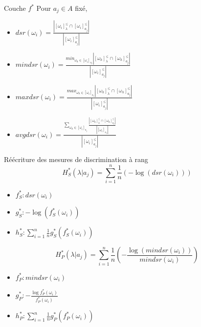 \documentclass[usenames,dvipsnames]{beamer}
\newcommand{\myfrac}[2]{\frac{\displaystyle {#1}}{\displaystyle {#2}}}
\begin{document}
\begin{frame}{Couche $f^*$}
    Pour $a_j \in A$ fixé,
    \begin{itemize}
        \item $dsr(\omega_i) = \myfrac{| [\omega_i]^{\leq}_{\lambda} \cap [\omega_i]^{\leq}_{a_j}|}{| [\omega_i]^{\leq}_{a_j} |}$
        \item $mindsr(\omega_i) = \myfrac{min_{\omega_h \in [\omega_i]_{a_j}} |[\omega_h]^{\leq}_{\lambda} \cap [\omega_h]^{\leq}_{a_j}|}{| [\omega_i]^{\leq}_{a_j} |}$
        \item $maxdsr(\omega_i) = \myfrac{max_{\omega_h \in [\omega_i]_{a_j}} |[\omega_h]^{\leq}_{\lambda} \cap [\omega_h]^{\leq}_{a_j}|}{| [\omega_i]^{\leq}_{a_j} |}$
        \item $avgdsr(\omega_i) = \myfrac{\displaystyle\sum_{\omega_h \in [\omega_i]_{a_j}} \myfrac{|[\omega_h]^{\leq}_{\lambda} \cap [\omega_h]^{\leq}_{a_j}|}{|[\omega_i]_{a_j}|}}{| [\omega_i]^{\leq}_{a_j} |}$
    \end{itemize}
\end{frame}

\begin{frame}{Réécriture des mesures de discrimination à rang}
         $$H^*_S\left(\lambda|a_j\right) = \displaystyle\sum_{i=1}^{n}\myfrac{1}{n} \left(-\log\left(dsr\left(\omega_i\right)\right)\right)$$
        \begin{itemize}
            \item $f^*_S : dsr(\omega_i)$
            \item $g^*_S : -\log(f^*_S(\omega_i))$
            \item $h^*_S : \sum_{i=1}^{n} \myfrac{1}{n} g^*_S(f^*_S(\omega_i))$
        \end{itemize}
     $$H^*_P\left(\lambda|a_j\right) = \displaystyle\sum_{i=1}^{n}\myfrac{1}{n} \left(-\myfrac{\log\left(mindsr\left(\omega_i\right)\right)}{mindsr\left(\omega_i\right)}\right)$$
        \begin{itemize}
            \item $f^*_P : mindsr(\omega_i)$
            \item $g^*_P : -\myfrac{\log f^*_P(\omega_i)}{f^*_P(\omega_i)}$
            \item $h^*_P : \sum_{i=1}^{n} \myfrac{1}{n} g^*_P(f^*_P(\omega_i))$
        \end{itemize}
\end{frame}
\end{document}

